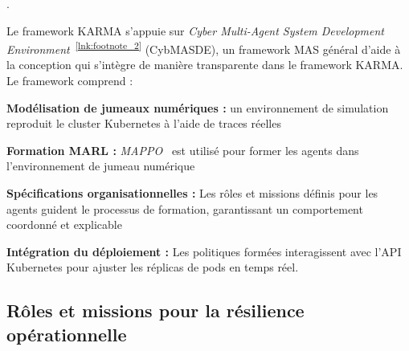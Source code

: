 
.

Le framework KARMA s'appuie sur \textit{Cyber Multi-Agent System Development Environment}~\textsuperscript{\ref{lnk:footnote_2}} (CybMASDE), un framework MAS général d'aide à la conception qui s'intègre de manière transparente dans le framework KARMA.
Le framework comprend :
\begin{enumerate*}[label=\textbf{\arabic*)}, itemjoin={;\quad }]
    \item \textbf{Modélisation de jumeaux numériques :} un environnement de simulation reproduit le cluster Kubernetes à l'aide de traces réelles
    \item \textbf{Formation MARL :} \textit{MAPPO}~\cite{Yu2022} est utilisé pour former les agents dans l'environnement de jumeau numérique
    \item \textbf{Spécifications organisationnelles :} Les rôles et missions définis pour les agents guident le processus de formation, garantissant un comportement coordonné et explicable
    \item \textbf{Intégration du déploiement :} Les politiques formées interagissent avec l'API Kubernetes pour ajuster les réplicas de pods en temps réel.
\end{enumerate*}

\subsection{Rôles et missions pour la résilience opérationnelle}


